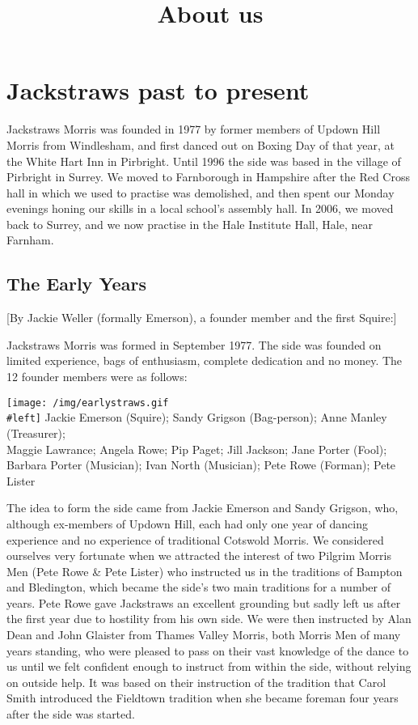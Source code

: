 \documentclass[
]{article}
\title{About us}
\author{}
\date{}
\begin{document}
\maketitle

\hypertarget{jackstraws-past-to-present}{%
\section{Jackstraws past to present}\label{jackstraws-past-to-present}}

Jackstraws Morris was founded in 1977 by former members of Updown Hill
Morris from Windlesham, and first danced out on Boxing Day of that year,
at the White Hart Inn in Pirbright. Until 1996 the side was based in the
village of Pirbright in Surrey. We moved to Farnborough in Hampshire
after the Red Cross hall in which we used to practise was demolished,
and then spent our Monday evenings honing our skills in a local school's
assembly hall. In 2006, we moved back to Surrey, and we now practise in
the Hale Institute Hall, Hale, near Farnham.

\hypertarget{the-early-years}{%
\subsection{The Early Years}\label{the-early-years}}

{[}By Jackie Weller (formally Emerson), a founder member and the first
Squire:{]}

Jackstraws Morris was formed in September 1977. The side was founded on
limited experience, bags of enthusiasm, complete dedication and no
money. The 12 founder members were as follows:

\texttt{[image: /img/earlystraws.gif\\\#left]} Jackie Emerson (Squire);
Sandy Grigson (Bag-person); Anne Manley (Treasurer);\\
Maggie Lawrance; Angela Rowe; Pip Paget; Jill Jackson; Jane Porter
(Fool);\\
Barbara Porter (Musician); Ivan North (Musician); Pete Rowe (Forman);
Pete Lister

The idea to form the side came from Jackie Emerson and Sandy Grigson,
who, although ex-members of Updown Hill, each had only one year of
dancing experience and no experience of traditional Cotswold Morris. We
considered ourselves very fortunate when we attracted the interest of
two Pilgrim Morris Men (Pete Rowe \& Pete Lister) who instructed us in
the traditions of Bampton and Bledington, which became the side's two
main traditions for a number of years. Pete Rowe gave Jackstraws an
excellent grounding but sadly left us after the first year due to
hostility from his own side. We were then instructed by Alan Dean and
John Glaister from Thames Valley Morris, both Morris Men of many years
standing, who were pleased to pass on their vast knowledge of the dance
to us until we felt confident enough to instruct from within the side,
without relying on outside help. It was based on their instruction of
the tradition that Carol Smith introduced the Fieldtown tradition when
she became foreman four years after the side was started.
\end{document}
